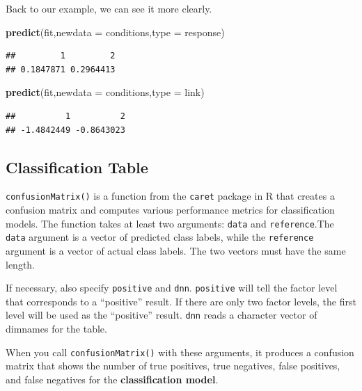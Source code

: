 \documentclass[
]{ctexart}
\newenvironment{Shaded}{\begin{snugshade}}{\end{snugshade}}
\newcommand{\AttributeTok}[1]{\textcolor[rgb]{0.13,0.29,0.53}{#1}}
\newcommand{\FunctionTok}[1]{\textcolor[rgb]{0.13,0.29,0.53}{\textbf{#1}}}
\newcommand{\NormalTok}[1]{#1}
\newcommand{\StringTok}[1]{\textcolor[rgb]{0.31,0.60,0.02}{#1}}
\begin{document}
Back to our example, we can see it more clearly.

\begin{Shaded}
\begin{Highlighting}[]
\FunctionTok{predict}\NormalTok{(fit,}\AttributeTok{newdata =}\NormalTok{ conditions,}\AttributeTok{type =} \StringTok{\textquotesingle{}response\textquotesingle{}}\NormalTok{)}
\end{Highlighting}
\end{Shaded}

\begin{verbatim}
##         1         2 
## 0.1847871 0.2964413
\end{verbatim}

\begin{Shaded}
\begin{Highlighting}[]
\FunctionTok{predict}\NormalTok{(fit,}\AttributeTok{newdata =}\NormalTok{ conditions,}\AttributeTok{type =} \StringTok{\textquotesingle{}link\textquotesingle{}}\NormalTok{)}
\end{Highlighting}
\end{Shaded}

\begin{verbatim}
##          1          2 
## -1.4842449 -0.8643023
\end{verbatim}

\hypertarget{classification-table-1}{%
\subsection{Classification Table}\label{classification-table-1}}

\texttt{confusionMatrix()} is a function from the \texttt{caret} package
in R that creates a confusion matrix and computes various performance
metrics for classification models. The function takes at least two
arguments: \texttt{data} and \texttt{reference}.The \texttt{data}
argument is a vector of predicted class labels, while the
\texttt{reference} argument is a vector of actual class labels. The two
vectors must have the same length.

If necessary, also specify \texttt{positive} and \texttt{dnn}.
\texttt{positive} will tell the factor level that corresponds to a
``positive'' result. If there are only two factor levels, the first
level will be used as the ``positive'' result. \texttt{dnn} reads a
character vector of dimnames for the table.

When you call \texttt{confusionMatrix()} with these arguments, it
produces a confusion matrix that shows the number of true positives,
true negatives, false positives, and false negatives for the
\textbf{classification model}.
\end{document}
